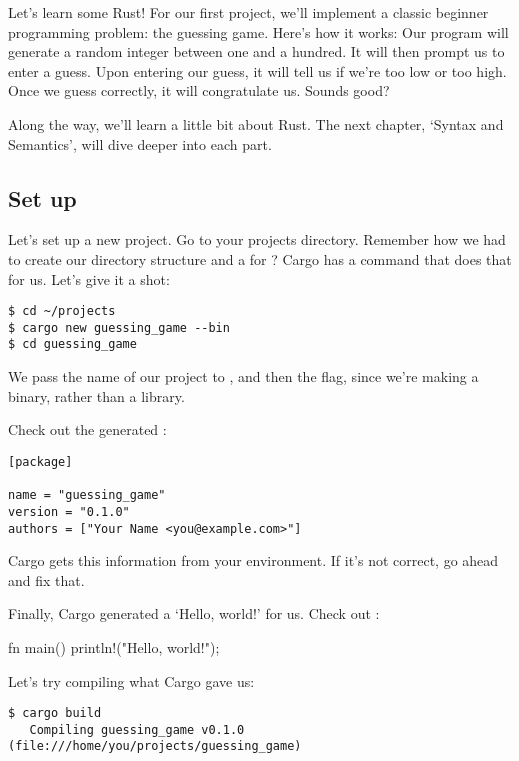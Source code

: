 Let’s learn some Rust! For our first project, we’ll implement a classic beginner programming problem: the guessing game. 
Here’s how it works: Our program will generate a random integer between one and a hundred. It will then prompt us to enter 
a guess. Upon entering our guess, it will tell us if we’re too low or too high. Once we guess correctly, it will congratulate 
us. Sounds good?

\blank

Along the way, we’ll learn a little bit about Rust. The next chapter, ‘Syntax and Semantics’, will dive deeper into each part.

\subsection{Set up}

Let’s set up a new project. Go to your projects directory. Remember how we had to create our directory structure and a 
 for ? Cargo has a command that does that for us. Let’s give it a shot:

\begin{verbatim}
$ cd ~/projects
$ cargo new guessing_game --bin
$ cd guessing_game
\end{verbatim}

We pass the name of our project to , and then the  flag, since we’re making a binary, rather than 
a library.

\blank

Check out the generated :

\begin{verbatim}
[package]

name = "guessing_game"
version = "0.1.0"
authors = ["Your Name <you@example.com>"]
\end{verbatim}

Cargo gets this information from your environment. If it’s not correct, go ahead and fix that.

\blank

Finally, Cargo generated a ‘Hello, world!’ for us. Check out :

\begin{rustc}
fn main() {
    println!("Hello, world!");
}
\end{rustc}

Let’s try compiling what Cargo gave us:

\begin{verbatim}
$ cargo build
   Compiling guessing_game v0.1.0 (file:///home/you/projects/guessing_game)  
\end{verbatim}

